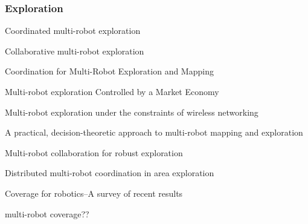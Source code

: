 
\subsubsection{Exploration}

Coordinated multi-robot exploration
\cite{burgard2005coordinated}

Collaborative multi-robot exploration
\cite{burgard2000collaborative}

Coordination for Multi-Robot Exploration and Mapping
\cite{simmons2000coordination}

Multi-robot exploration Controlled by a Market Economy
\cite{zlot2002multi}

Multi-robot exploration under the constraints of wireless networking
\cite{rooker2007multi}

A practical, decision-theoretic approach to multi-robot mapping and exploration
\cite{ko2003practical}

Multi-robot collaboration for robust exploration
\cite{rekleitis2001multi}

Distributed multi-robot coordination in area exploration
\cite{sheng2006distributed}

Coverage for robotics–A survey of recent results

multi-robot coverage??